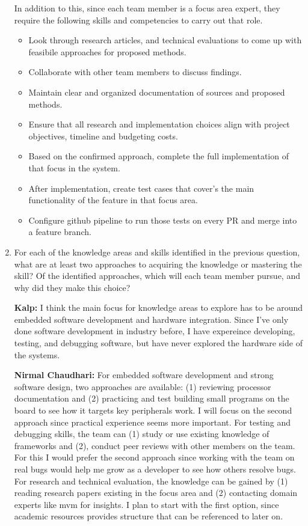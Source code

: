 \begin{enumerate}
  In addition to this, since each team member is a focus area expert, they 
  require the following skills
  and competencies to carry out that role.

  \begin{itemize}\setlength\itemsep{4pt}\setlength{\leftmargini}{2em}
    \item Look through research articles, and technical evaluations to come up 
    with feasibile approaches for proposed methods. 
    \item Collaborate with other team members to discuss findings. 
    \item Maintain clear and organized documentation of sources and proposed 
    methods. 
    \item Ensure that all research and implementation choices align with project
     objectives, timeline and budgeting costs. 
    \item Based on the confirmed approach, complete the full implementation of 
    that focus in the system. 
    \item After implementation, create test cases that cover's the main 
    functionality of the feature in that focus area. 
    \item Configure github pipeline to run those tests on every PR and merge 
    into a feature branch. 
  \end{itemize}


  \item For each of the knowledge areas and skills identified in the previous
  question, what are at least two approaches to acquiring the knowledge or
  mastering the skill?  Of the identified approaches, which will each team
  member pursue, and why did they make this choice?

  \textbf{Kalp:} I think the main focus for knowledge areas to explore has to be
  around embedded software development and hardware integration. Since I've only
  done software development in industry before, I have expereince developing, 
  testing, and debugging software, but have never explored the hardware side of
  the systems. 

  \textbf{Nirmal Chaudhari:} For embedded software development and strong 
  software design, two approaches are available: (1) reviewing processor 
  documentation and (2) practicing and test building small programs on the 
  board to see how it targets key peripherals work. I will focus on the second 
  approach since practical experience seems more important. For testing and 
  debugging skills, the team can (1) study or use existing knowledge of 
  frameworks and (2), conduct peer reviews with other members on the team. 
  For this I would prefer the second approach since working with the team 
  on real bugs would help me grow as a developer to see how others resolve bugs.
  For research and technical evaluation, the knowledge can be gained by (1) 
  reading research papers existing in the focus area and (2) contacting domain 
  experts like mvm for insights. I plan to start with the first option, 
  since academic resources provides structure that can be referenced to later on. 
\end{enumerate}
